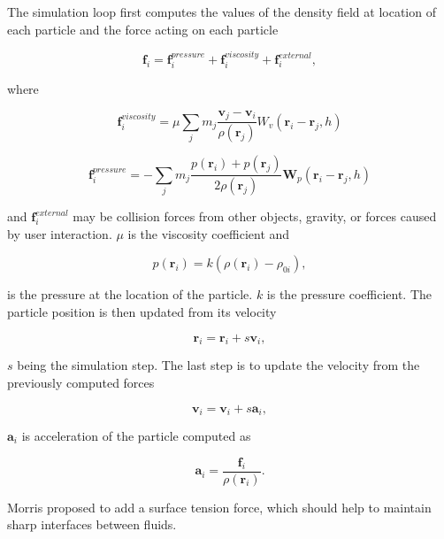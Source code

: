 \documentclass[a4paper,report]{IEEEtran}
\begin{document}
The simulation loop first computes the values of the density field at location of each particle and the force acting on each particle

\begin{equation}
	\mathbf{f}_i = \mathbf{f}_{i}^{pressure} + \mathbf{f}_{i}^{viscosity} + \mathbf{f}_{i}^{external},
\end{equation}

where 

\begin{equation}
	\mathbf{f}_{i}^{viscosity} = \mu\sum_{j}m_j\frac{\mathbf{v}_j-\mathbf{v}_i}{\rho(\mathbf{r}_j)} W_v(\mathbf{r}_i-\mathbf{r}_j, h)
\end{equation}

\begin{equation}
	\mathbf{f}_{i}^{pressure} = -\sum_{j}m_j\frac{p(\mathbf{r}_i)+p(\mathbf{r}_j)}{2\rho(\mathbf{r}_j)} \mathbf{W}_p(\mathbf{r}_i-\mathbf{r}_j, h)
\end{equation}

and $\mathbf{f}_{i}^{external}$ may be collision forces from other objects, gravity, or forces caused by user interaction. $\mu$ is the viscosity coefficient and 

\begin{equation}
	p(\mathbf{r}_i) = k(\rho(\mathbf{r}_i)-\rho_{0i}),
\end{equation}

is the pressure at the location of the particle. $k$ is the pressure coefficient. The particle position is then updated from its velocity 

\begin{equation}
	\mathbf{r}_i = \mathbf{r}_i + s\mathbf{v}_i,
\end{equation}

$s$ being the simulation step. The last step is to update the velocity from the previously computed forces

\begin{equation}
	\mathbf{v}_i = \mathbf{v}_i + s\mathbf{a}_i,
\end{equation}

$\mathbf{a}_i$ is acceleration of the particle computed as

\begin{equation}
	\mathbf{a}_i = \frac{\mathbf{f}_{i}}{\rho(\mathbf{r}_{i})}.
\end{equation}

Morris \cite{Articles:Morris} proposed to add a surface tension force, which should help to maintain sharp interfaces between fluids.
\end{document}
